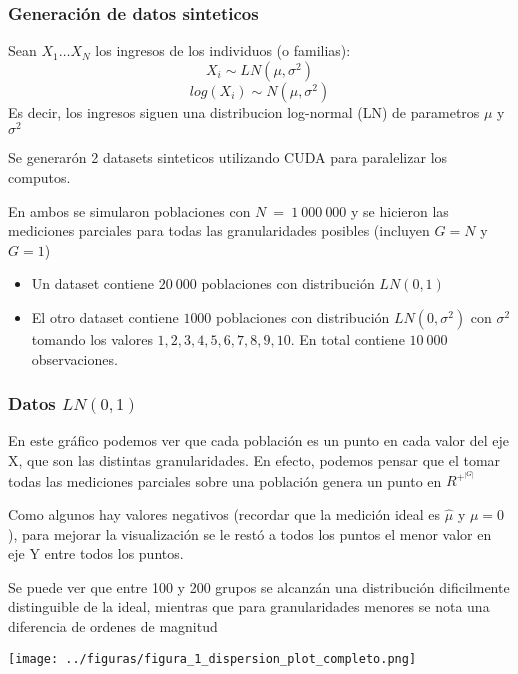 \documentclass[10pt,mathserif]{beamer}%
\begin{document}
\begin{frame}
    \frametitle{ Generación de datos sinteticos }
    \begin{lemma}
        Sean $X_1 \dots X_N$ los ingresos de los individuos (o familias):
        $$X_i \sim LN(\mu,\sigma^2)$$ 
        $$ log(X_i) \sim N(\mu, \sigma^2)$$
        Es decir, los ingresos siguen una distribucion log-normal (LN) de parametros $\mu$ y $\sigma^2$
    \end{lemma}
    
    Se generarón 2 datasets sinteticos utilizando CUDA para paralelizar los computos.

    En ambos se simularon poblaciones con $N\ =\ 1\ 000\ 000$ y se hicieron las mediciones parciales para todas las granularidades posibles (incluyen $G=N$ y $G=1$)

    \begin{itemize}
        \item Un dataset contiene $20\ 000$ poblaciones con distribución $LN(0,1)$
        \item El otro dataset contiene $1 000$ poblaciones con distribución $LN(0, \sigma^2)$ con $\sigma^2$ tomando los valores $1, 2, 3, 4, 5, 6, 7, 8, 9, 10$. En total contiene $10\ 000$ observaciones. 
    \end{itemize}

\end{frame}

\begin{frame}
    \frametitle{Datos $LN(0,1)$}
    \begin{multicols}{2}
        \begin{minipage}{\linewidth}
            En este gráfico podemos ver que cada población es un punto en cada valor del eje X, que son las distintas granularidades. En efecto, podemos pensar que el tomar todas las mediciones parciales sobre una población genera un punto en $R^+^{|G|}$

            Como algunos hay valores negativos (recordar que la medición ideal es $\hat{\mu}$ y $\mu=0$), para mejorar la visualización se le restó a todos los puntos el menor valor en eje Y entre todos los puntos.

            Se puede ver que entre 100 y 200 grupos se alcanzán una distribución dificilmente distinguible de la ideal, mientras que para granularidades menores se nota una diferencia de ordenes de magnitud

        \end{minipage}

        \begin{minipage}{\linewidth}
            \centering
            \texttt{[image: ../figuras/figura\_1\_dispersion\_plot\_completo.png]} %
        \end{minipage}

    \end{multicols}
\end{frame}
\end{document}
